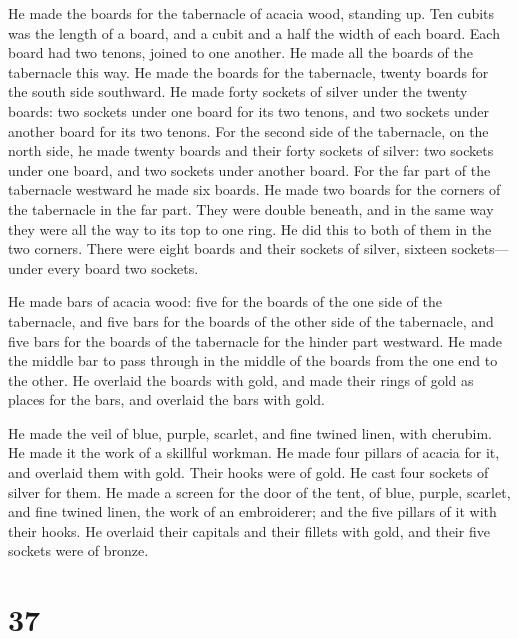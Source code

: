  He made the boards for the tabernacle of acacia wood,
standing up.  Ten cubits was the length of a board, and a
cubit and a half the width of each board.  Each board had
two tenons, joined to one another. He made all the boards of the
tabernacle this way.  He made the boards for the
tabernacle, twenty boards for the south side southward.  He
made forty sockets of silver under the twenty boards: two sockets under
one board for its two tenons, and two sockets under another board for
its two tenons.  For the second side of the tabernacle, on
the north side, he made twenty boards  and their forty
sockets of silver: two sockets under one board, and two sockets under
another board.  For the far part of the tabernacle westward
he made six boards.  He made two boards for the corners of
the tabernacle in the far part.  They were double beneath,
and in the same way they were all the way to its top to one ring. He did
this to both of them in the two corners.  There were eight
boards and their sockets of silver, sixteen sockets---under every board
two sockets.

 He made bars of acacia wood: five for the boards of the
one side of the tabernacle,  and five bars for the boards
of the other side of the tabernacle, and five bars for the boards of the
tabernacle for the hinder part westward.  He made the
middle bar to pass through in the middle of the boards from the one end
to the other.  He overlaid the boards with gold, and made
their rings of gold as places for the bars, and overlaid the bars with
gold.

 He made the veil of blue, purple, scarlet, and fine twined
linen, with cherubim. He made it the work of a skillful workman.
 He made four pillars of acacia for it, and overlaid them
with gold. Their hooks were of gold. He cast four sockets of silver for
them.  He made a screen for the door of the tent, of blue,
purple, scarlet, and fine twined linen, the work of an embroiderer;
 and the five pillars of it with their hooks. He overlaid
their capitals and their fillets with gold, and their five sockets were
of bronze.

\hypertarget{section-36}{%
\section{37}\label{section-36}}

